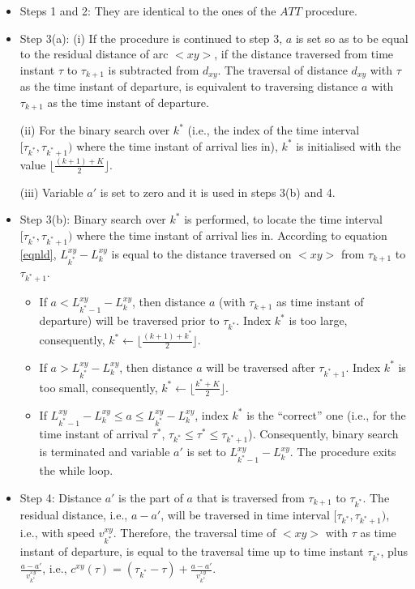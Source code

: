 \documentclass[conference]{IEEEtran}
\begin{document}
\begin{itemize}
    \item Steps 1 and 2: They are identical to the ones of the $ATT$ procedure.
    
    \item Step 3(a): (i) If the procedure is continued to step 3, $a$ is set so as to be equal to the residual distance of arc $<xy>$, if the distance traversed from time instant $\tau$ to $\tau_{k+1}$ is subtracted from $d_{xy}$. The traversal of distance $d_{xy}$ with $\tau$ as the time instant of departure, is equivalent to traversing distance $a$ with $\tau_{k+1}$ as the time instant of departure. 
    
    (ii) For the binary search over $k^*$ (i.e., the index of the time interval $[\tau_{k^*},\tau_{k^*+1})$ where the time instant of arrival lies in), $k^*$ is initialised with the value $\lfloor \frac{(k+1)+K}{2} \rfloor$. 
    
    (iii) Variable $a'$ is set to zero and it is used in steps 3(b) and 4.
    
    \item Step 3(b): Binary search over $k^*$ is performed, to locate the time interval $[\tau_{k^*},\tau_{k^*+1})$ where the time instant of arrival lies in. According to equation \ref{eqnld}, $L_{k^*}^{xy}-L_{k}^{xy}$ is equal to the distance traversed on $<xy>$ from $\tau_{k+1}$ to $\tau_{k^*+1}$. 
    
    \begin{itemize}
        \item If $a< L_{k^*-1}^{xy}-L_{k}^{xy}$, then distance $a$ (with $\tau_{k+1}$ as time instant of departure) will be traversed prior to $\tau_{k^*}$. Index $k^*$ is too large, consequently, $k^*\leftarrow \lfloor \frac{(k+1)+k^*}{2} \rfloor $.  
        \item If $a> L_{k^*}^{xy}-L_{k}^{xy}$, then distance $a$ will be traversed after $\tau_{k^*+1}$. Index $k^*$ is too small, consequently,  $k^*\leftarrow \lfloor \frac{k^*+K}{2} \rfloor $. 
        \item If $L_{k^*-1}^{xy}-L_{k}^{xy}\leq a \leq L_{k^*}^{xy}-L_{k}^{xy}$, index $k^*$ is the ``correct'' one (i.e., for the time instant of arrival $\tau^*$, $\tau_{k^*}\leq \tau^* \leq \tau_{k^*+1}$). Consequently, binary search is terminated and variable $a'$ is set to $L_{k^*-1}^{xy}-L_{k}^{xy}$. The procedure exits the while loop. 
    \end{itemize}
    \item Step 4: Distance $a'$ is the part of $a$ that is traversed from $\tau_{k+1}$ to $\tau_{k^*}$. The residual distance, i.e., $a-a'$, will be traversed in time interval $[\tau_{k^*}, \tau_{k^*+1})$, i.e., with speed $v_{k^*}^{xy}$. Therefore, the traversal time of $<xy>$ with $\tau$ as time instant of departure, is equal to the traversal time up to time instant $\tau_{k^*}$,  plus $\frac{a-a'}{v_{k^*}^{xy}}$, i.e., $c^{xy}(\tau)=(\tau_{k^*}-\tau)+\frac{a-a'}{v_{k^*}^{xy}}$.
\end{itemize}
\end{document}
